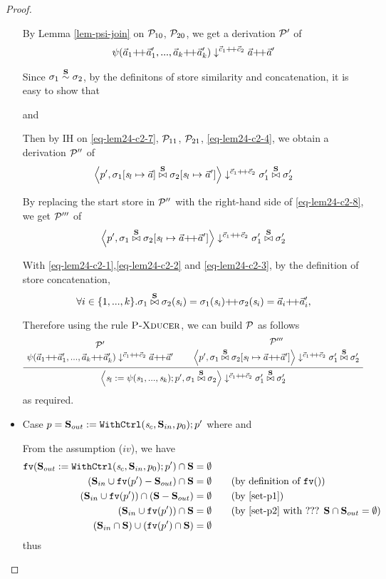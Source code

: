 \begin{proof}
\begin{itemize}
    By Lemma \ref{lem-psi-join} on $\mathcal{P}_{10}$, $\mathcal{P}_{20}$, we get a derivation $\mathcal{P}'$ of 
    \[ \sevalfg{\lcall}{\a_1  {\++} \a_1',...,\a_k {\++} \a_k' } 
             {\c_1 {\++} \c_2} {\a {\++} \a'} \]
    
    Since $\sigma_1 \stackrel{\mathbf{S}}{\sim} \sigma_2$, by the definitons of store similarity and concatenation, it is easy to show that 
   
 \def\sgmxp{\sgm_1[\s_l \|-> \a ] \x{\S} \sgm_2[\s_l \|-> \a']}
    and 
    \eq{eq-lem24-c2-8}{\sgmxp = \sgmx[\s_l \|-> \a {\++} \a'] }
    

    
    Then by IH on \eqref{eq-lem24-c2-7}, $\mathcal{P}_{11}$, $\mathcal{P}_{21}$, \eqref{eq-lem24-c2-4}, we obtain
    a derivation $\mathcal{P}''$ of 
    \[\seval{p'}{\sgmxp}{\c_1 {\++} \c_2}{\sgm_1' \x{\S} \sgm_2'} \]
    
    By replacing the start store in $\mathcal{P}''$ with  the right-hand side of \eqref{eq-lem24-c2-8}, we get $\mathcal{P}'''$ of 
    \[\seval{p'}{\sgmx[\s_l \|-> \a {\++} \a']}{\c_1 {\++} \c_2}{\sgm_1' \x{\S} \sgm_2'} \]
    
    With \eqref{eq-lem24-c2-1},\eqref{eq-lem24-c2-2} and \eqref{eq-lem24-c2-3}, 
    by the definition of store concatenation,
    $$\forall i \in \{1,...,k\}.\sgmx(\s_i) = \sgm_1(\s_i) {\++} \sgm_2(\s_i) = \a_i {\++} \a_i',$$
    
    Therefore using the rule $\textsc{P-Xducer}$, we can build $\mathcal{P}$ as follows
   	$$\PT{\UCN{\MP'}{\sevalfg{\lcall}{\a_1  {\++} \a_1',...,\a_k {\++} \a_k' } 
   			{\c_1 {\++} \c_2} {\a {\++} \a'}}
    	\UCN{\MP'''}{\seval{p'}{\sgmx[\s_l \|-> \a {\++} \a']}{\c_1 {\++} \c_2}{\sgm_1' \x{\S} \sgm_2'}}
    	\BC{\seval{\casetwo}{\sgmx}{\c_1 {\++} \c_2}{\sgm_1' \x{\S} \sgm_2'}}
    } $$
    as required.


\item Case $p = \mathbf{S}_{out} := \mathtt{WithCtrl}(\mathit{s}_c,\mathbf{S}_{in},p_0); p'$ where  
  and

\def\casethree{\withctrl{\s_c}{p_0}{\Sin}{\Sout}; p'}

	From the assumption ($iv$), we have 
	\begin{align*}
	\FV{\casethree} \cap \S & = \emptyset \\
	(\Sin \cup \FV{p'} - \Sout) \cap \S & = \emptyset \tag{by definition of $\FV{}$} \\
	(\Sin \cup \FV{p'}) \cap (\S-\Sout) & = \emptyset \tag{by \eqref{set-p1}} \\
	(\Sin \cup \FV{p'}) \cap \S & = \emptyset \tag{by \eqref{set-p2} with ??? $\S \cap \Sout = \emptyset$} \\
	(\Sin \cap \S) \cup (\FV{p'} \cap \S ) & = \emptyset 
	\end{align*}
	thus 
	

\end{itemize}
\end{proof}
